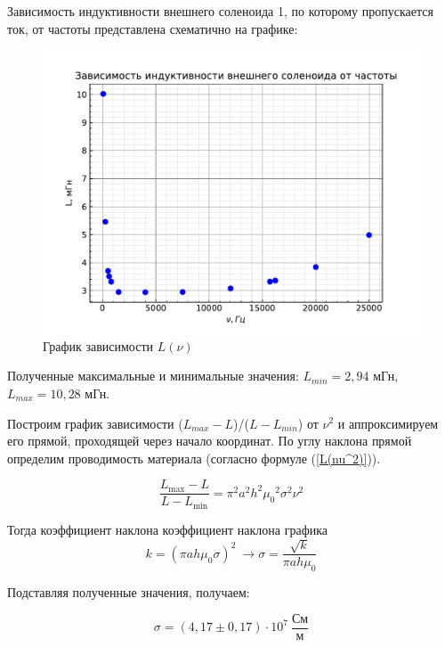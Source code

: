 \documentclass[a4paper, 12pt]{article} %
\begin{document}
    \newpage

    Зависимость индуктивности внешнего соленоида 1, по которому пропускается ток, от частоты представлена схематично на графике:
    
	\begin{figure}[h!]
		\centering
		\includegraphics[width = \textwidth]{L(nu).pdf}
		\caption{График зависимости $L(\nu)$}
        \label{the inductance depends on frequency}
	\end{figure}
	
	Полученные максимальные и минимальные значения: $L_{min} = 2,94$ мГн, $L_{max} = 10,28$ мГн.

    Построим график зависимости ($L_{max} - L$)/($L - L_{min}$) от $\nu^2$ и аппроксимируем его прямой, проходящей через начало координат. По углу наклона прямой определим проводимость материала (согласно формуле (\ref{L(nu^2)})).
    
	\begin{equation*}
		\frac{L_{\max} - L}{L - L_{\min}} = \pi ^2 a^2 h^2 {\mu_0}^2 \sigma^2 \nu^2
	\end{equation*}
	
	Тогда коэффициент наклона  коэффициент наклона графика
	\[k = (\pi ah\mu_0 \sigma)^2 \ \rightarrow \sigma = \frac{\sqrt{k}}{\pi ah \mu_0}\]
	
	Подставляя полученные значения, получаем:
	
	\begin{equation}
		\sigma = (4,17 \pm 0,17) \cdot 10^7  \ \frac{\text{См}}{\text{м}}
	\end{equation}
	
\end{document}
